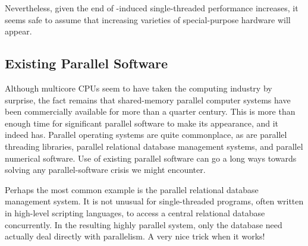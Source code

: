 Nevertheless, given the end of -induced
single-threaded performance increases, it seems safe to assume that
increasing varieties of special-purpose hardware will appear.

\subsection{Existing Parallel Software}
\label{sec:cpu:Existing Parallel Software}

Although multicore CPUs seem to have taken the computing industry
by surprise, the fact remains that shared-memory parallel computer
systems have been commercially available for more than a quarter
century.
This is more than enough time for significant parallel software
to make its appearance, and it indeed has.
Parallel operating systems are quite commonplace, as are parallel
threading libraries, parallel relational database management systems, 
and parallel numerical software.
Use of existing parallel software can go a long ways towards solving any
parallel-software crisis we might encounter.

Perhaps the most common example is the parallel relational database
management system.
It is not unusual for single-threaded programs, often written in
high-level scripting languages, to access a central relational
database concurrently.
In the resulting highly parallel system, only the database need actually
deal directly with parallelism.
A very nice trick when it works!
